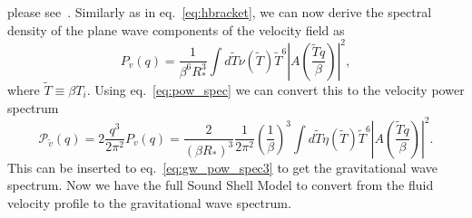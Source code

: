 please see~\cite[section 4.2]{hindmarsh_gw_pt_2019}.
Similarly as in eq.~\eqref{eq:hbracket}, we can now derive the spectral density of the plane wave components of the velocity field as
\cite[eq. 4.17]{hindmarsh_gw_pt_2019}
\begin{equation}
P_v(q) = \frac{1}{\beta^6 R_*^3} \int d\tilde{T} \nu(\tilde{T}) \tilde{T}^6 \left| A \left( \frac{\tilde{T}q}{\beta} \right) \right|^2,
\label{eq:spec_den_v}
\end{equation}
where $\tilde{T} \equiv \beta T_i$.
Using eq.~\eqref{eq:pow_spec} we can convert this to the velocity power spectrum
\cite[eq. 4.18]{hindmarsh_gw_pt_2019}
\begin{equation}
\mathcal{P}_{\tilde{v}}(q)
= 2 \frac{q^3}{2\pi^2} P_v(q)
= \frac{2}{(\beta R_*)^3} \frac{1}{2\pi^2} \left(\frac{1}{\beta}\right)^3
\int d \tilde{T} \eta(\tilde{T}) \tilde{T}^6 \left| A \left( \frac{\tilde{T} q}{\beta} \right) \right|^2.
\label{eq:pow_v}
\end{equation}
This can be inserted to eq.~\eqref{eq:gw_pow_spec3} to get the gravitational wave spectrum.
Now we have the full Sound Shell Model to convert from the fluid velocity profile to the gravitational wave spectrum.


